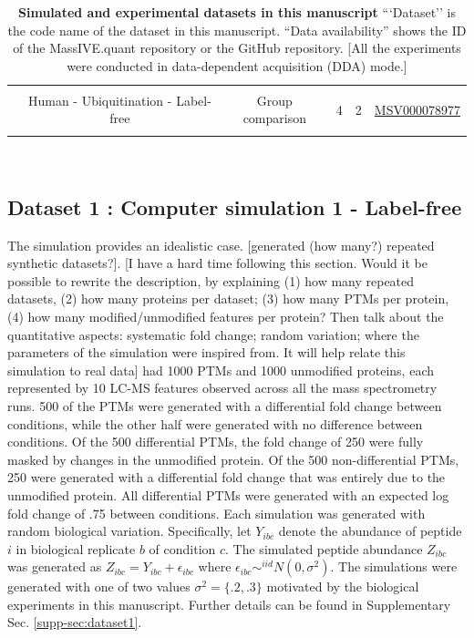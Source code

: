 \documentclass[mcp]{article}
\numberwithin{table}{section}
\def\todo#1{{\color{red}[#1]}}
\begin{document}
\begin{table}[h!]
\begin{tiny}
\begin{tabular}{|c|c|ccc|c|}
&&&&& \\%
& Human - Ubiquitination - Label-free & Group comparison & 4 & 2 & \href{https://massive.ucsd.edu/ProteoSAFe/dataset.jsp?task=1b516164de5345108b40b75147dd58b5}{MSV000078977}\\ [0.02in]
 &&&&& \\
 \hline
\end{tabular}\\
\end{tiny}
\caption{ \small {\bf Simulated and experimental datasets in this manuscript} 
```Dataset'' is the code name of the dataset in this manuscript.
``Data availability'' shows the ID of the MassIVE.quant repository or the GitHub repository.  \todo{All the experiments were conducted in data-dependent acquisition (DDA) mode.}
}
\label{tab:dataDescription}
\end{table}

\subsection*{Dataset 1 : Computer simulation 1 - Label-free}
\label{sec:comp_sim_procedure1}

The simulation provides an idealistic case. \todo{generated (how many?)  repeated synthetic datasets?}. \todo{I have a hard time following this section. Would it be possible to rewrite the description, by explaining (1) how many repeated datasets, (2) how many proteins per dataset; (3) how many PTMs per protein, (4) how many modified/unmodified features per protein? Then talk about the quantitative aspects: systematic fold change; random variation; where the parameters of the simulation were inspired from. It will help relate this simulation to real data} had 1000 PTMs and 1000 unmodified proteins, each represented by 10 LC-MS features observed across all the mass spectrometry runs. 500 of the PTMs were generated with a differential fold change between conditions, while the other half were generated with no difference between conditions. Of the 500 differential PTMs, the fold change of 250 were fully masked by changes in the unmodified protein. Of the 500 non-differential PTMs, 250 were generated with a differential fold change that was entirely due to the unmodified protein. All differential PTMs were generated with an expected log fold change of .75 between conditions. Each simulation was generated with random biological variation. Specifically, let $Y_{ibc}$ denote the abundance of peptide $i$ in biological replicate $b$ of condition $c$. The simulated peptide abundance  $Z_{ibc}$ was generated as $Z_{ibc} = Y_{ibc} + \epsilon_{ibc}$ where $\epsilon_{ibc}\sim^{iid}N(0,\sigma^2)$. The simulations were generated with one of two values $\sigma^2 = \{.2, .3\}$ motivated by the biological experiments in this manuscript.
Further details can be found in Supplementary Sec. \ref{supp-sec:dataset1}.
\end{document}
